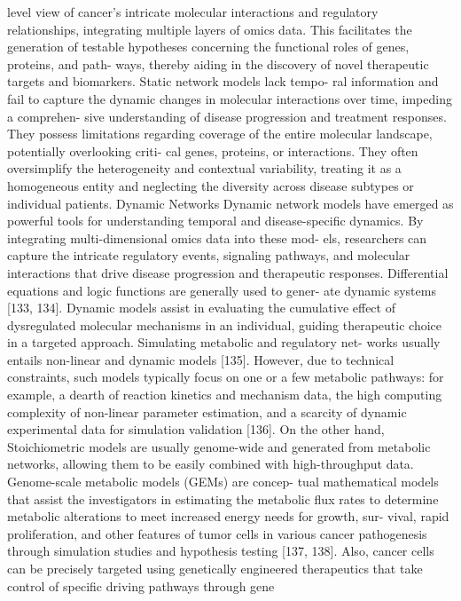 level view of cancer’s intricate molecular interactions and
regulatory relationships, integrating multiple layers of omics
data. This facilitates the generation of testable hypotheses
concerning the functional roles of genes, proteins, and path-
ways, thereby aiding in the discovery of novel therapeutic
targets and biomarkers. Static network models lack tempo-
ral information and fail to capture the dynamic changes in
molecular interactions over time, impeding a comprehen-
sive understanding of disease progression and treatment
responses. They possess limitations regarding coverage of
the entire molecular landscape, potentially overlooking criti-
cal genes, proteins, or interactions. They often oversimplify
the heterogeneity and contextual variability, treating it as
a homogeneous entity and neglecting the diversity across
disease subtypes or individual patients.
Dynamic Networks
Dynamic network models have emerged as powerful tools
for understanding temporal and disease-specific dynamics.
By integrating multi-dimensional omics data into these mod-
els, researchers can capture the intricate regulatory events,
signaling pathways, and molecular interactions that drive
disease progression and therapeutic responses. Differential
equations and logic functions are generally used to gener-
ate dynamic systems [133, 134]. Dynamic models assist in
evaluating the cumulative effect of dysregulated molecular
mechanisms in an individual, guiding therapeutic choice in a
targeted approach. Simulating metabolic and regulatory net-
works usually entails non-linear and dynamic models [135].
However, due to technical constraints, such models typically
focus on one or a few metabolic pathways: for example, a
dearth of reaction kinetics and mechanism data, the high
computing complexity of non-linear parameter estimation,
and a scarcity of dynamic experimental data for simulation
validation [136].
On the other hand, Stoichiometric models are usually
genome-wide and generated from metabolic networks,
allowing them to be easily combined with high-throughput
data. Genome-scale metabolic models (GEMs) are concep-
tual mathematical models that assist the investigators in
estimating the metabolic flux rates to determine metabolic
alterations to meet increased energy needs for growth, sur-
vival, rapid proliferation, and other features of tumor cells
in various cancer pathogenesis through simulation studies
and hypothesis testing [137, 138]. Also, cancer cells can be
precisely targeted using genetically engineered therapeutics
that take control of specific driving pathways through gene
